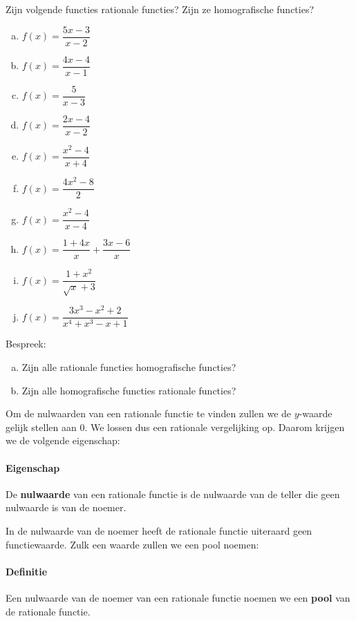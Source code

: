 \documentclass[12pt]{article}
\begin{document}
\begin{oefening}
Zijn volgende functies rationale functies? Zijn ze homografische functies?
\begin{multicols}{2}
\begin{enumerate}[(a)]
  \itemsep1em
  \item $f(x)=\dfrac{5x-3}{x-2}$
  \item $f(x)=\dfrac{4x-4}{x-1}$
  \item $f(x)=\dfrac{5}{x-3}$
  \item $f(x)=\dfrac{2x-4}{x-2}$
  \item $f(x)=\dfrac{x^2-4}{x+4}$
  \item $f(x)=\dfrac{4x^2-8}{2}$
  \item $f(x)=\dfrac{x^2-4}{x-4}$
  \item $f(x)=\dfrac{1+4x}{x}+\dfrac{3x-6}{x}$
  \item $f(x)=\dfrac{1+x^2}{\sqrt{x}+3}$
  \item $f(x)=\dfrac{3x^3-x^2+2}{x^4+x^3-x+1}$
\end{enumerate}
\end{multicols}
\end{oefening}

\begin{oefening}
Bespreek:
\begin{enumerate}[(a)]
  \item Zijn alle rationale functies homografische functies?
  \item Zijn alle homografische functies rationale functies?
\end{enumerate}
\end{oefening}

Om de nulwaarden van een rationale functie te vinden zullen we de $y$-waarde gelijk stellen aan $0$. We lossen dus een rationale vergelijking op. Daarom krijgen we de volgende eigenschap:

\paragraph*{Eigenschap}
\begin{mdframed}
De {\bf nulwaarde} van een rationale functie is de nulwaarde van de teller die geen nulwaarde is van de noemer.
\end{mdframed}

In de nulwaarde van de noemer heeft de rationale functie uiteraard geen functiewaarde. Zulk een waarde zullen we een pool noemen:

\paragraph*{Definitie}
\begin{mdframed}
Een nulwaarde van de noemer van een rationale functie noemen we een {\bf pool} van de rationale functie.
\end{mdframed}
\end{document}
